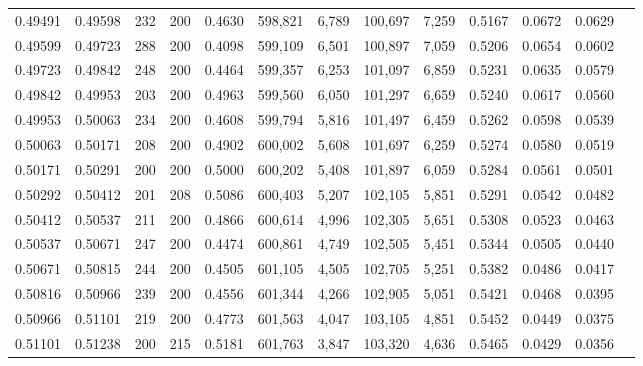 \begin{tabular}{rrrrrrrrrrrrr}
0.49491 & 0.49598 &   232 & 200 &                                     0.4630 & 598,821 &   6,789 & 100,697 &   7,259 & 0.5167 & 0.0672 & 0.0629 \\
0.49599 & 0.49723 &   288 & 200 &                                     0.4098 & 599,109 &   6,501 & 100,897 &   7,059 & 0.5206 & 0.0654 & 0.0602 \\
0.49723 & 0.49842 &   248 & 200 &                                     0.4464 & 599,357 &   6,253 & 101,097 &   6,859 & 0.5231 & 0.0635 & 0.0579 \\
0.49842 & 0.49953 &   203 & 200 &                                     0.4963 & 599,560 &   6,050 & 101,297 &   6,659 & 0.5240 & 0.0617 & 0.0560 \\
0.49953 & 0.50063 &   234 & 200 &                                     0.4608 & 599,794 &   5,816 & 101,497 &   6,459 & 0.5262 & 0.0598 & 0.0539 \\
0.50063 & 0.50171 &   208 & 200 &                                     0.4902 & 600,002 &   5,608 & 101,697 &   6,259 & 0.5274 & 0.0580 & 0.0519 \\
0.50171 & 0.50291 &   200 & 200 &                                     0.5000 & 600,202 &   5,408 & 101,897 &   6,059 & 0.5284 & 0.0561 & 0.0501 \\
0.50292 & 0.50412 &   201 & 208 &                                     0.5086 & 600,403 &   5,207 & 102,105 &   5,851 & 0.5291 & 0.0542 & 0.0482 \\
0.50412 & 0.50537 &   211 & 200 &                                     0.4866 & 600,614 &   4,996 & 102,305 &   5,651 & 0.5308 & 0.0523 & 0.0463 \\
0.50537 & 0.50671 &   247 & 200 &                                     0.4474 & 600,861 &   4,749 & 102,505 &   5,451 & 0.5344 & 0.0505 & 0.0440 \\
0.50671 & 0.50815 &   244 & 200 &                                     0.4505 & 601,105 &   4,505 & 102,705 &   5,251 & 0.5382 & 0.0486 & 0.0417 \\
0.50816 & 0.50966 &   239 & 200 &                                     0.4556 & 601,344 &   4,266 & 102,905 &   5,051 & 0.5421 & 0.0468 & 0.0395 \\
0.50966 & 0.51101 &   219 & 200 &                                     0.4773 & 601,563 &   4,047 & 103,105 &   4,851 & 0.5452 & 0.0449 & 0.0375 \\
0.51101 & 0.51238 &   200 & 215 &                                     0.5181 & 601,763 &   3,847 & 103,320 &   4,636 & 0.5465 & 0.0429 & 0.0356 \\

\end{tabular}
